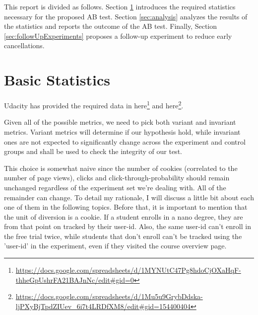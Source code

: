 \documentclass[11pt]{article}
\begin{document}
	This report is divided as follows.
	Section \ref{sec:requiredStatistics} introduces the required statistics necessary for the proposed AB test.
	Section \ref{sec:analysis} analyzes the results of the statistics and reports the outcome of the AB test.
	Finally, Section \ref{sec:followUpExperiments} proposes a follow-up experiment to reduce early cancellations.

\section{Basic Statistics} \label{sec:requiredStatistics}

	Udacity has provided the required data in here\footnote{\url{https://docs.google.com/spreadsheets/d/1MYNUtC47Pg8hdoCjOXaHqF-thheGpUshrFA21BAJnNc/edit#gid=0}} and here\footnote{\url{https://docs.google.com/spreadsheets/d/1Mu5u9GrybDdska-ljPXyBjTpdZIUev_6i7t4LRDfXM8/edit#gid=154400404}}.
	
	Given all of the possible metrics, we need to pick both variant and invariant metrics.
	Variant metrics will determine if our hypothesis hold, while invariant ones are not expected to significantly change across the experiment and control groups and shall be used to check the integrity of our test.	
	
	This choice is somewhat naive since the number of cookies (correlated to the number of page views), clicks and click-through-probability should remain unchanged regardless of the experiment set we're dealing with.
	All of the remainder can change.
	To detail my rationale, I will discuss a little bit about each one of them in the following topics.
	Before that, it is important to mention that the unit of diversion is a cookie.
	If a student enrolls in a nano degree, they are from that point on tracked by their user-id.
	Also, the same user-id can't enroll in the free trial twice, while students that don't enroll can't be tracked using the 'user-id' in the experiment, even if they visited the course overview page.
\end{document}
